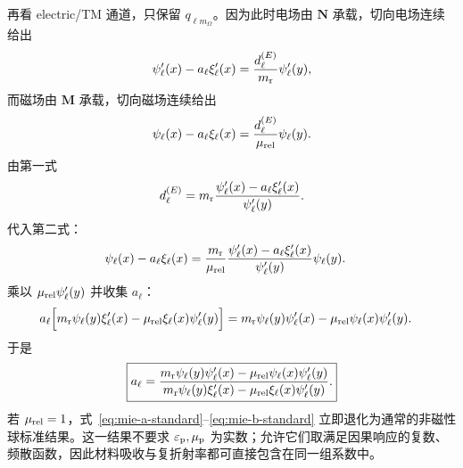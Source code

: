 再看 electric/TM 通道，只保留 $q_{\ell m_{\Omega}}$。因为此时电场由
$\bm N$ 承载，切向电场连续给出
\begin{equation}
\psi_\ell'(x)-a_\ell\xi_\ell'(x)
=\frac{d_\ell^{(E)}}{m_{\rm r}}
\psi_\ell'(y),
\label{eq:mie-E-bc-E}
\end{equation}
而磁场由 $\bm M$ 承载，切向磁场连续给出
\begin{equation}
\psi_\ell(x)-a_\ell\xi_\ell(x)
=\frac{d_\ell^{(E)}}{\mu_{\rm rel}}
\psi_\ell(y).
\label{eq:mie-E-bc-H}
\end{equation}
由第一式
\begin{equation}
d_\ell^{(E)}
=m_{\rm r}
\frac{\psi_\ell'(x)-a_\ell\xi_\ell'(x)}
{\psi_\ell'(y)}.
\end{equation}
代入第二式：
\begin{align}
\psi_\ell(x)-a_\ell\xi_\ell(x)
&=\frac{m_{\rm r}}{\mu_{\rm rel}}
\frac{\psi_\ell'(x)-a_\ell\xi_\ell'(x)}
{\psi_\ell'(y)}\psi_\ell(y).
\end{align}
乘以 $\mu_{\rm rel}\psi_\ell'(y)$ 并收集 $a_\ell$：
\begin{align}
a_\ell\Bigl[
 m_{\rm r}\psi_\ell(y)\xi_\ell'(x)
-\mu_{\rm rel}\xi_\ell(x)\psi_\ell'(y)
\Bigr]
={}&
 m_{\rm r}\psi_\ell(y)\psi_\ell'(x)
-\mu_{\rm rel}\psi_\ell(x)\psi_\ell'(y).
\end{align}
于是
\begin{equation}
\boxed{
a_\ell=
\frac{
 m_{\rm r}\psi_\ell(y)\psi_\ell'(x)
-\mu_{\rm rel}\psi_\ell(x)\psi_\ell'(y)
}{
 m_{\rm r}\psi_\ell(y)\xi_\ell'(x)
-\mu_{\rm rel}\xi_\ell(x)\psi_\ell'(y)
}.}
\label{eq:mie-a-standard}
\end{equation}
若 $\mu_{\rm rel}=1$，式~\eqref{eq:mie-a-standard}--\eqref{eq:mie-b-standard} 立即退化为通常的非磁性球标准结果。这一结果不要求
$\varepsilon_{\rm p},\mu_{\rm p}$ 为实数；允许它们取满足因果响应的复数、频散函数，因此材料吸收与复折射率都可直接包含在同一组系数中。

